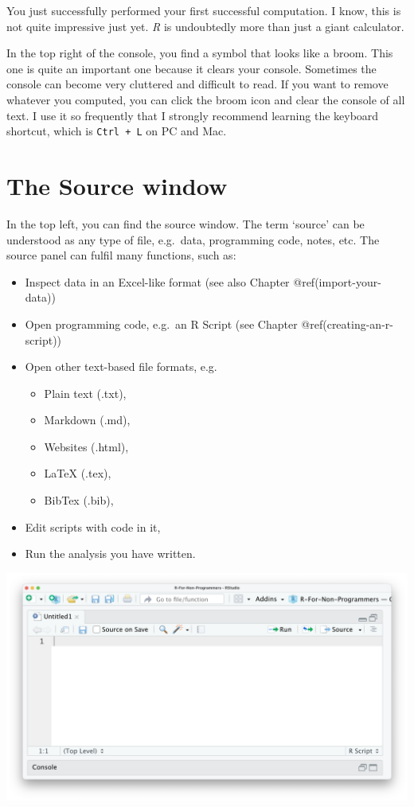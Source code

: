 \documentclass[
  letterpaper,
]{krantz}
\begin{document}
You just successfully performed your first successful computation. I
know, this is not quite impressive just yet. \emph{R} is undoubtedly
more than just a giant calculator.

In the top right of the console, you find a symbol that looks like a
broom. This one is quite an important one because it clears your
console. Sometimes the console can become very cluttered and difficult
to read. If you want to remove whatever you computed, you can click the
broom icon and clear the console of all text. I use it so frequently
that I strongly recommend learning the keyboard shortcut, which is
\texttt{Ctrl\ +\ L} on PC and Mac.

\section{The Source window}\label{sec-the-source-window}

In the top left, you can find the source window. The term `source' can
be understood as any type of file, e.g.~data, programming code, notes,
etc. The source panel can fulfil many functions, such as:

\begin{itemize}
\item
  Inspect data in an Excel-like format (see also Chapter
  @ref(import-your-data))
\item
  Open programming code, e.g.~an R Script (see Chapter
  @ref(creating-an-r-script))
\item
  Open other text-based file formats, e.g.

  \begin{itemize}
  \item
    Plain text (.txt),
  \item
    Markdown (.md),
  \item
    Websites (.html),
  \item
    LaTeX (.tex),
  \item
    BibTex (.bib),
  \end{itemize}
\item
  Edit scripts with code in it,
\item
  Run the analysis you have written.
\end{itemize}

\includegraphics{images/chapter_04_img/03_source_window/01_rstudio_source.png}
\end{document}
